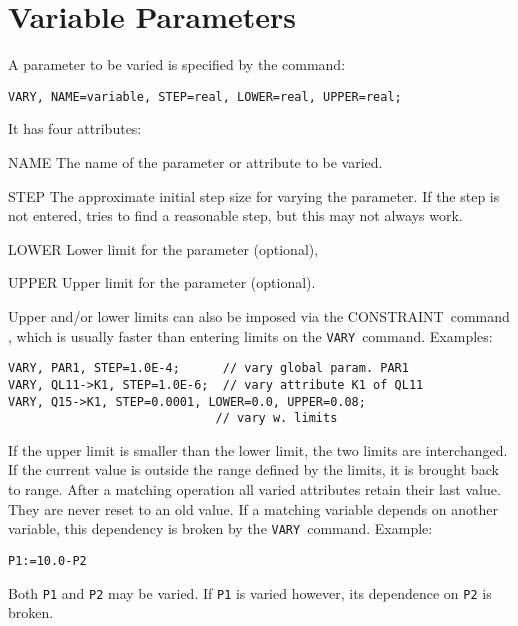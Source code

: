 \section{Variable Parameters}
\label{sec:vary}
A parameter to be varied is specified by the command:
\begin{verbatim}
VARY, NAME=variable, STEP=real, LOWER=real, UPPER=real;
\end{verbatim}
It has four attributes:
\begin{kdescription}
\item[NAME]
  The name of the parameter  or
  attribute  to be varied.
\item[STEP]
  The approximate initial step size for varying the parameter.
  If the step is not entered, \opal tries to find a reasonable step,
  but this may not always work.
\item[LOWER]
  Lower limit for the parameter (optional),
\item[UPPER]
  Upper limit for the parameter (optional).
\end{kdescription}
Upper and/or lower limits can also be imposed via the
{CONSTRAINT}~command ,
which is usually faster than entering limits on the
\texttt{VARY}~command.
Examples:
\begin{verbatim}
VARY, PAR1, STEP=1.0E-4;      // vary global param. PAR1
VARY, QL11->K1, STEP=1.0E-6;  // vary attribute K1 of QL11
VARY, Q15->K1, STEP=0.0001, LOWER=0.0, UPPER=0.08;
                             // vary w. limits
\end{verbatim}
If the upper limit is smaller than the lower limit,
the two limits are interchanged.
If the current value is outside the range defined by the limits,
it is brought back to range.
After a matching operation all varied attributes retain their last value.
They are never reset to an old value.
If a matching variable depends on another variable,
this dependency is broken by the \texttt{VARY}~command.
Example:
\begin{verbatim}
P1:=10.0-P2
\end{verbatim}
Both \texttt{P1} and \texttt{P2} may be varied.
If \texttt{P1} is varied however, its dependence on \texttt{P2} is broken.


